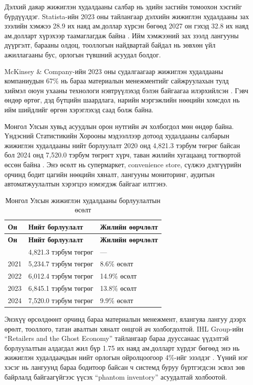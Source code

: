 Дэлхий даяар жижиглэн худалдааны салбар нь эдийн засгийн томоохон хэсгийг бүрдүүлдэг. Statista-ийн 2023 оны тайлангаар дэлхийн жижиглэн худалдааны зах зээлийн хэмжээ 28.9 их наяд ам.доллар хүрсэн бөгөөд 2027 он гэхэд 32.8 их наяд ам.долларт хүрэхээр таамаглагдаж байна \cite{statista_retail}. Ийм хэмжээний зах зээлд лангууны дүүргэлт, барааны олдоц, тооллогын найдвартай байдал нь зөвхөн үйл ажиллагааны бус, орлогын түвшний асуудал болдог.

McKinsey \& Company-ийн 2023 оны судалгаагаар жижиглэн худалдааны компаниудын 67\% нь бараа материалын менежментийг сайжруулахын тулд хиймэл оюун ухааны технологи нэвтрүүлэхэд бэлэн байгаагаа илэрхийлсэн \cite{mckinsey_retail}. Гэвч өндөр өртөг, дэд бүтцийн шаардлага, нарийн мэргэжлийн нөөцийн хомсдол нь ийм шийдлийг өргөн хэрэглэхэд саад болж байна.

Монгол Улсын хувьд асуудлын орон нутгийн ач холбогдол мөн өндөр байна. Үндэсний Статистикийн Хорооны мэдээллээр дотоод худалдааны салбарын жижиглэн худалдааны нийт борлуулалт 2020 онд 4{,}821.3 тэрбум төгрөг байсан бол 2024 онд 7{,}520.0 тэрбум төгрөгт хүрч, таван жилийн хугацаанд тогтвортой өссөн байна \cite{nso_mongolia}. Энэ өсөлт нь супермаркет, convenience store, сүлжээ дэлгүүрийн орчинд бодит цагийн нөөцийн хяналт, лангууны мониторинг, аудитын автоматжуулалтын хэрэгцээ нэмэгдэж байгааг илтгэнэ.

\begin{longtable}{|p{2.2cm}|p{4cm}|p{4cm}|}
\caption{Монгол Улсын жижиглэн худалдааны борлуулалтын өсөлт} \label{tab:intro_mn_retail} \\
\hline
\textbf{Он} & \textbf{Нийт борлуулалт} & \textbf{Жилийн өөрчлөлт} \\
\hline
\endfirsthead
\hline
\textbf{Он} & \textbf{Нийт борлуулалт} & \textbf{Жилийн өөрчлөлт} \\
\hline
\endhead
\hline
\endfoot
2020 & 4{,}821.3 тэрбум төгрөг & --- \\
\hline
2021 & 5{,}234.7 тэрбум төгрөг & 8.6\% өсөлт \\
\hline
2022 & 6{,}012.4 тэрбум төгрөг & 14.9\% өсөлт \\
\hline
2023 & 6{,}845.1 тэрбум төгрөг & 13.8\% өсөлт \\
\hline
2024 & 7{,}520.0 тэрбум төгрөг & 9.9\% өсөлт \\
\hline
\end{longtable}

Энэхүү өрсөлдөөнт орчинд бараа материалын менежмент, ялангуяа лангуу дээрх өрөлт, тооллого, татан авалтын хяналт онцгой ач холбогдолтой. IHL Group-ийн ``Retailers and the Ghost Economy'' тайлангаар бараа дууссанаас үүдэлтэй борлуулалтын алдагдал жил бүр 1.75 их наяд ам.долларт хүрдэг бөгөөд энэ нь жижиглэн худалдаачдын нийт орлогын ойролцоогоор 4\%-ийг эзэлдэг \cite{retail_stats}. Үүний нэг хэсэг нь лангуунд бараа бодитоор байсан ч системд буруу бүртгэгдсэн эсвэл зөв байрлалд байгаагүйгээс үүсэх ``phantom inventory'' асуудалтай холбоотой.

